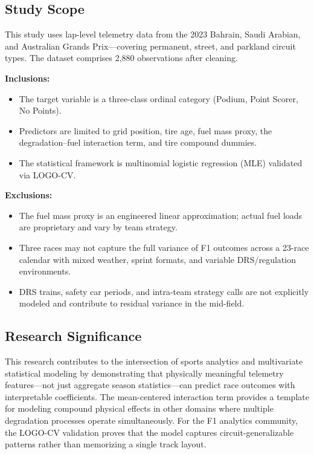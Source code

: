 \subsection{Study Scope}

This study uses lap-level telemetry data from the 2023 Bahrain, Saudi Arabian,
and Australian Grands Prix---covering permanent, street, and parkland circuit
types. The dataset comprises 2,880 observations after cleaning.

\textbf{Inclusions:}
\begin{itemize}
  \item The target variable is a three-class ordinal category (Podium, Point
    Scorer, No Points).
  \item Predictors are limited to grid position, tire age, fuel mass proxy,
    the degradation--fuel interaction term, and tire compound dummies.
  \item The statistical framework is multinomial logistic regression (MLE)
    validated via LOGO-CV.
\end{itemize}

\textbf{Exclusions:}
\begin{itemize}
  \item The fuel mass proxy is an engineered linear approximation; actual fuel
    loads are proprietary and vary by team strategy.
  \item Three races may not capture the full variance of F1 outcomes across a
    23-race calendar with mixed weather, sprint formats, and variable
    DRS/regulation environments.
  \item DRS trains, safety car periods, and intra-team strategy calls are not
    explicitly modeled and contribute to residual variance in the mid-field.
\end{itemize}

\subsection{Research Significance}

This research contributes to the intersection of sports analytics and
multivariate statistical modeling by demonstrating that physically meaningful
telemetry features---not just aggregate season statistics---can predict race
outcomes with interpretable coefficients. The mean-centered interaction term
provides a template for modeling compound physical effects in other domains
where multiple degradation processes operate simultaneously. For the F1
analytics community, the LOGO-CV validation proves that the model captures
circuit-generalizable patterns rather than memorizing a single track layout.
